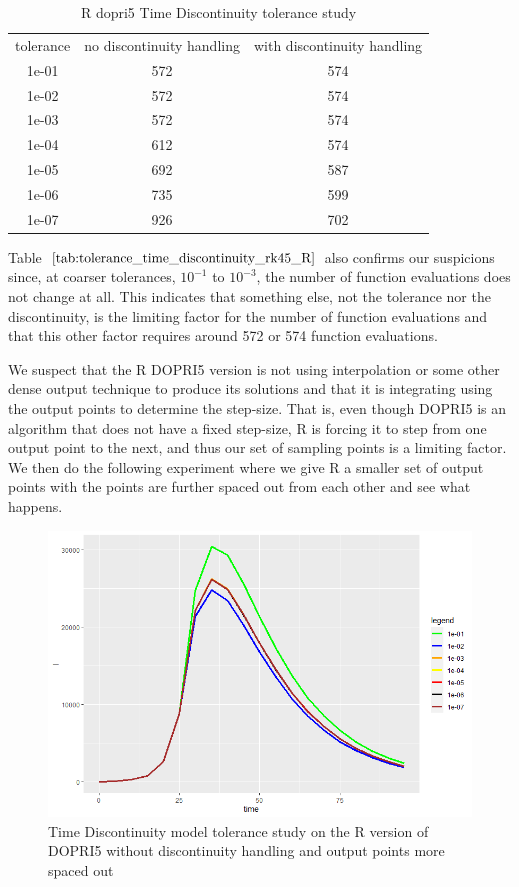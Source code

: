 \begin{table}[h]
\caption {R dopri5 Time Discontinuity tolerance study} \label{tab:tolerance_time_discontinuity_rk45_R} 
\begin{center}
\begin{tabular}{ c c c }
tolerance & no discontinuity handling & with discontinuity handling\\ 
1e-01 & 572 & 574 \\
1e-02 & 572 & 574 \\
1e-03 & 572 & 574 \\
1e-04 & 612 & 574 \\
1e-05 & 692 & 587 \\
1e-06 & 735 & 599 \\
1e-07 & 926 & 702 \\
\end{tabular}
\end{center}
\end{table}

Table $\ref{tab:tolerance_time_discontinuity_rk45_R}$ also confirms our suspicions since, at coarser tolerances, $10^{-1}$ to $10^{-3}$, the number of function evaluations does not change at all. This indicates that something else, not the tolerance nor the discontinuity, is the limiting factor for the number of function evaluations and that this other factor requires around 572 or 574 function evaluations.

We suspect that the R DOPRI5 version is not using interpolation or some other dense output technique to produce its solutions and that it is integrating using the output points to determine the step-size. That is, even though DOPRI5 is an algorithm that does not have a fixed step-size, R is forcing it to step from one output point to the next, and thus our set of sampling points is a limiting factor. We then do the following experiment where we give R a smaller set of output points with the points are further spaced out from each other and see what happens.

\begin{figure}[h]
\centering
\includegraphics[width=0.7\linewidth]{./figures/tolerance_time_rk45_further_no_event_R}
\caption{Time Discontinuity model tolerance study on the R version of DOPRI5 without discontinuity handling and output points more spaced out}
\label{fig:tolerance_time_rk45_further_no_event_R}
\end{figure}

